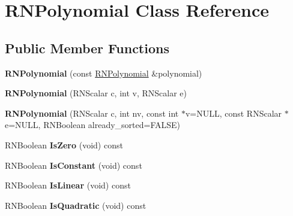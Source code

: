 \hypertarget{class_r_n_polynomial}{}\section{R\+N\+Polynomial Class Reference}
\label{class_r_n_polynomial}
\subsection*{Public Member Functions}
\begin{DoxyCompactItemize}
\item 
{\bfseries R\+N\+Polynomial} (const \hyperlink{class_r_n_polynomial}{R\+N\+Polynomial} \&polynomial)\hypertarget{class_r_n_polynomial_a734538cfdf84a28b083e3a18b1d7bd55}{}\label{class_r_n_polynomial_a734538cfdf84a28b083e3a18b1d7bd55}

\item 
{\bfseries R\+N\+Polynomial} (R\+N\+Scalar c, int v, R\+N\+Scalar e)\hypertarget{class_r_n_polynomial_a0d0715c10a1b6e248c92e697b86b9e6f}{}\label{class_r_n_polynomial_a0d0715c10a1b6e248c92e697b86b9e6f}

\item 
{\bfseries R\+N\+Polynomial} (R\+N\+Scalar c, int nv, const int $\ast$v=N\+U\+LL, const R\+N\+Scalar $\ast$e=N\+U\+LL, R\+N\+Boolean already\+\_\+sorted=F\+A\+L\+SE)\hypertarget{class_r_n_polynomial_a14fc912dcf9fa6a4fd28ff998420d280}{}\label{class_r_n_polynomial_a14fc912dcf9fa6a4fd28ff998420d280}

\item 
R\+N\+Boolean {\bfseries Is\+Zero} (void) const \hypertarget{class_r_n_polynomial_aadc89190ef27ab427aaaa3cef57cd89c}{}\label{class_r_n_polynomial_aadc89190ef27ab427aaaa3cef57cd89c}

\item 
R\+N\+Boolean {\bfseries Is\+Constant} (void) const \hypertarget{class_r_n_polynomial_ad5c7d4ddd1ceb0753f846c0cab03ff7e}{}\label{class_r_n_polynomial_ad5c7d4ddd1ceb0753f846c0cab03ff7e}

\item 
R\+N\+Boolean {\bfseries Is\+Linear} (void) const \hypertarget{class_r_n_polynomial_abed9e36d70024074207c8fe5195e2073}{}\label{class_r_n_polynomial_abed9e36d70024074207c8fe5195e2073}

\item 
R\+N\+Boolean {\bfseries Is\+Quadratic} (void) const \hypertarget{class_r_n_polynomial_ab7c0bd3438eafb1cd592674040bdad8a}{}\label{class_r_n_polynomial_ab7c0bd3438eafb1cd592674040bdad8a}


\end{DoxyCompactItemize}
